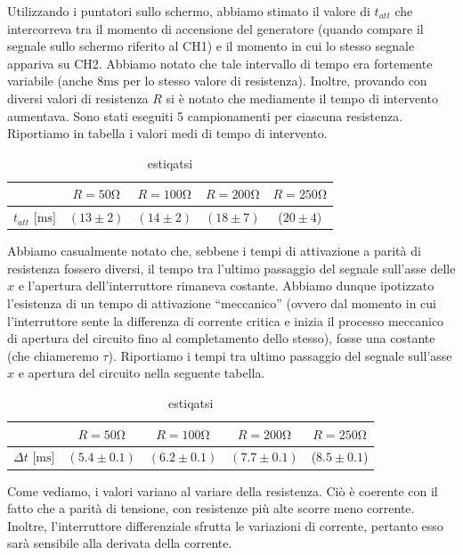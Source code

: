 Utilizzando i puntatori sullo schermo, abbiamo stimato il valore di $t_{att}$ che intercorreva tra il momento di accensione del generatore (quando compare il segnale sullo schermo riferito al CH1) e il momento in cui lo stesso segnale appariva su CH2. Abbiamo notato che tale intervallo di tempo era fortemente variabile (anche $8\si{\milli\second}$ per lo stesso valore di resistenza). Inoltre, provando con diversi valori di resistenza $R$ si è notato che mediamente il tempo di intervento aumentava. Sono stati eseguiti 5 campionamenti per ciascuna resistenza. Riportiamo in tabella i valori medi di tempo di intervento.

\begin{table}[h]
\centering
\caption{estiqatsi}
{\renewcommand{\arraystretch}{1.6}%
\begin{tabular}{c|c|c|c|c}
 & $R=50 \si{\ohm}$ & $R=100 \si{\ohm}$ & $R=200 \si{\ohm}$ & $R=250 \si{\ohm}$ \\      \hline
$t_{att}$ [$\si{\milli\second}$] & $(13 \pm 2)$ & $(14 \pm 2)$ & $(18 \pm 7)$ & ($20 \pm 4$) \\\end{tabular}}
\end{table}


Abbiamo casualmente notato che, sebbene i tempi di attivazione a parità di resistenza fossero diversi, il tempo tra l'ultimo passaggio del segnale sull'asse delle $x$ e l'apertura dell'interruttore rimaneva costante. Abbiamo dunque ipotizzato l'esistenza di un tempo di attivazione ``meccanico'' (ovvero dal momento in cui l'interruttore sente la differenza di corrente critica e inizia il processo meccanico di apertura del circuito fino al completamento dello stesso), fosse una costante (che chiameremo $\tau$).  Riportiamo i tempi tra ultimo passaggio del segnale sull'asse $x$ e apertura del circuito nella seguente tabella. 

\begin{table}[h]
\centering
\caption{estiqatsi}
{\renewcommand{\arraystretch}{1.6}%
\begin{tabular}{c|c|c|c|c}
 & $R=50 \si{\ohm}$ & $R=100 \si{\ohm}$ & $R=200 \si{\ohm}$ & $R=250 \si{\ohm}$ \\      \hline
$\Delta t$ [$\si{\milli\second}$] & $(5.4 \pm 0.1)$ & $(6.2 \pm 0.1)$ & $(7.7 \pm 0.1)$ & ($8.5 \pm 0.1$) \\
\end{tabular}}
\end{table}

Come vediamo, i valori variano al variare della resistenza. Ciò è coerente con il fatto che a parità di tensione, con resistenze più alte scorre meno corrente. Inoltre, l'interruttore differenziale sfrutta le variazioni di corrente, pertanto esso sarà sensibile alla derivata della corrente.


